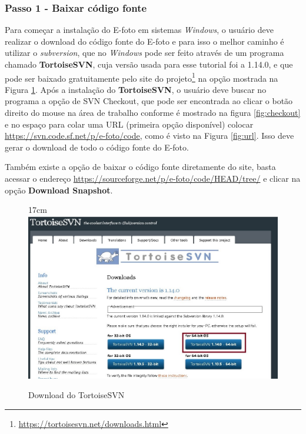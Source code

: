 \subsubsection{Passo 1 - Baixar código fonte}
Para começar a instalação do E-foto em sistemas \textit{Windows}, o usuário deve realizar o download do código fonte do E-foto e para isso o melhor caminho é utilizar o \textit{subversion}, que no \textit{Windows} pode ser feito através de um programa chamado \textbf{TortoiseSVN}, cuja versão usada para esse tutorial foi a 1.14.0, e que pode ser baixado gratuitamente pelo site do projeto\footnote{\url{https://tortoisesvn.net/downloads.html}} na opção mostrada na Figura \ref{fig:tortoise}. Após a instalação do \textbf{TortoiseSVN}, o usuário deve buscar no programa a opção de SVN Checkout, que pode ser encontrada ao clicar o botão direito do mouse na área de trabalho conforme é mostrado na figura \ref{fig:checkout} e no espaço para colar uma URL (primeira opção disponível) colocar \url{https://svn.code.sf.net/p/e-foto/code}, como é visto na Figura \ref{fig:url}. Isso deve gerar o download de todo o código fonte do E-foto.

Também existe a opção de baixar o código fonte diretamente do site, basta acessar o endereço \url {https://sourceforge.net/p/e-foto/code/HEAD/tree/} e clicar na opção \textbf{Download Snapshot}.
 
\begin{figure}[!ht]{17cm}
 	\centering
 	\includegraphics[width=12cm]{Figuras/tortoise.jpg}
 	\caption{Download do TortoiseSVN} \label{fig:tortoise}
\end{figure}

